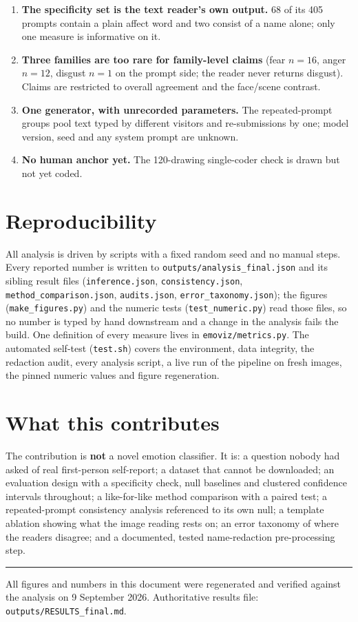 \documentclass[11pt,a4paper]{article}
\begin{document}
\begin{enumerate}
single-valence subsets have degenerate nulls, and the two readers disagree about the direction.
\item \textbf{The specificity set is the text reader's own output.} 68 of its 405 prompts contain a
plain affect word and two consist of a name alone; only one measure is informative on it.
\item \textbf{Three families are too rare for family-level claims} (fear $n=16$, anger $n=12$, disgust
$n=1$ on the prompt side; the reader never returns disgust). Claims are restricted to overall agreement
and the face/scene contrast.
\item \textbf{One generator, with unrecorded parameters.} The repeated-prompt groups pool text typed by
different visitors and re-submissions by one; model version, seed and any system prompt are unknown.
\item \textbf{No human anchor yet.} The 120-drawing single-coder check is drawn but not yet coded.
\end{enumerate}

\section{Reproducibility}

All analysis is driven by scripts with a fixed random seed and no manual steps. Every reported number
is written to \texttt{outputs/analysis\_final.json} and its sibling result files
(\texttt{inference.json}, \texttt{consistency.json}, \texttt{method\_comparison.json},
\texttt{audits.json}, \texttt{error\_taxonomy.json}); the figures (\texttt{make\_figures.py}) and
the numeric tests (\texttt{test\_numeric.py}) read those files, so no number is typed by hand
downstream and a change in the analysis fails the build. One definition of every measure lives in
\texttt{emoviz/metrics.py}. The automated self-test (\texttt{test.sh}) covers the environment, data
integrity, the redaction audit, every analysis script, a live run of the pipeline on fresh images,
the pinned numeric values and figure regeneration.

\section{What this contributes}

\begin{key}
The contribution is \textbf{not} a novel emotion classifier. It is: a question nobody had asked of
real first-person self-report; a dataset that cannot be downloaded; an evaluation design with a
specificity check, null baselines and clustered confidence intervals throughout; a like-for-like
method comparison with a paired test; a repeated-prompt consistency analysis referenced to its own
null; a template ablation showing what the image reading rests on; an error taxonomy of where the
readers disagree; and a documented, tested name-redaction pre-processing step.
\end{key}

\vspace{6pt}\hrule\vspace{6pt}
{\small\color{soft}All figures and numbers in this document were regenerated and verified against the
analysis on 9 September 2026. Authoritative results file: \texttt{outputs/RESULTS\_final.md}.}
\end{document}
